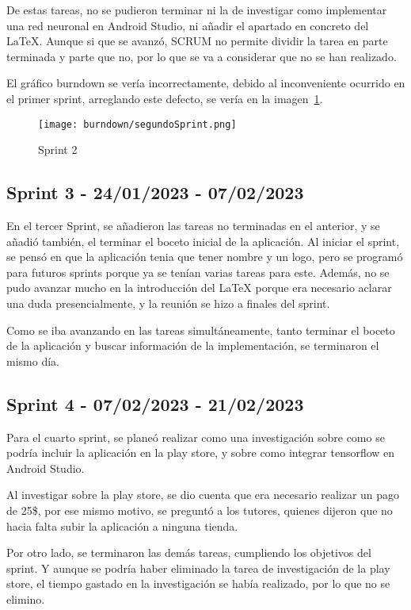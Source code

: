 De estas tareas, no se pudieron terminar ni la de investigar como implementar una red neuronal en Android Studio, ni añadir el apartado en concreto del LaTeX. Aunque si que se avanzó, SCRUM no permite dividir la tarea en parte terminada y parte que no, por lo que se va a considerar que no se han realizado.

El gráfico burndown se vería incorrectamente, debido al inconveniente ocurrido en el primer sprint, arreglando este defecto, se vería en la imagen~\ref{fig:Sprint2}.

\begin{figure}[!ht]
         \centering
         \texttt{[image: burndown/segundoSprint.png]}
         \caption{Sprint 2}
         \label{fig:Sprint2}
\end{figure}

\subsection{Sprint 3 - 24/01/2023 - 07/02/2023}
En el tercer Sprint, se añadieron las tareas no terminadas en el anterior, y se añadió también, el terminar el boceto inicial de la aplicación.
Al iniciar el sprint, se pensó en que la aplicación tenia que tener nombre y un logo, pero se programó para futuros sprints porque ya se tenían varias tareas para este.
Además, no se pudo avanzar mucho en la introducción del LaTeX porque era necesario aclarar una duda presencialmente, y la reunión se hizo a finales del sprint.

Como se iba avanzando en las tareas simultáneamente, tanto terminar el boceto de la aplicación y buscar información de la implementación, se terminaron el mismo día.
\subsection{Sprint 4 - 07/02/2023 - 21/02/2023}
Para el cuarto sprint, se planeó realizar como una investigación sobre como se podría incluir la aplicación en la play store, y sobre como integrar tensorflow en Android Studio.

Al investigar sobre la play store, se dio cuenta que era necesario realizar un pago de 25\$, por ese mismo motivo, se preguntó a los tutores, quienes dijeron que no hacia falta subir la aplicación a ninguna tienda.

Por otro lado, se terminaron las demás tareas, cumpliendo los objetivos del sprint. Y aunque se podría haber eliminado la tarea de investigación de la play store, el tiempo gastado en la investigación se había realizado, por lo que no se elimino.

